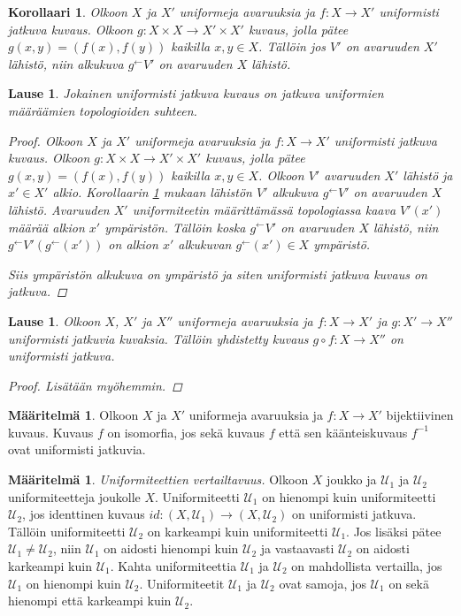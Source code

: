 \documentclass[12pt,a4paper,leqno]{report}
\newcommand{\U}{\mathcal{U}}
\theoremstyle{plain}
\newtheorem{lause}[equation]{Lause}
\newtheorem{kor}[equation]{Korollaari}
\theoremstyle{definition}
\newtheorem{maar}[equation]{Määritelmä}
\theoremstyle{remark}
\begin{document}
\begin{kor}\label{uniformi alkukuva}
Olkoon $X$ ja $X'$ uniformeja avaruuksia 
ja $f\colon X\rightarrow X'$ uniformisti jatkuva kuvaus. 
Olkoon $g\colon X\times X\rightarrow X'\times X'$ %
kuvaus, jolla pätee $g(x,y)=(f(x),f(y))$ kaikilla $x,y\in X$. 
Tällöin jos $V'$ on avaruuden $X'$ lähistö, niin alkukuva $g^{\leftarrow}V'$ on avaruuden $X$ lähistö.
\end{kor}
\begin{lause}
Jokainen uniformisti jatkuva kuvaus on jatkuva uniformien määräämien topologioiden suhteen.
\begin{proof}
Olkoon $X$ ja $X'$ uniformeja avaruuksia 
ja $f\colon X\rightarrow X'$ uniformisti jatkuva kuvaus. 
Olkoon $g\colon X\times X\rightarrow X'\times X'$ %
kuvaus, jolla pätee $g(x,y)=(f(x),f(y))$ kaikilla $x,y\in X$. 
Olkoon $V'$ avaruuden $X'$ lähistö ja $x'\in X'$ alkio. 
Korollaarin \ref{uniformi alkukuva} mukaan lähistön $V'$ alkukuva $g^{\leftarrow}V'$ on avaruuden $X$ lähistö. 
Avaruuden $X'$ uniformiteetin määrittämässä topologiassa kaava $V'(x')$ määrää alkion $x'$ ympäristön.
Tällöin koska $g^{\leftarrow}V'$ on avaruuden $X$ lähistö, niin $g^{\leftarrow}V'(g^{\leftarrow}(x'))$ on alkion $x'$ alkukuvan $g^{\leftarrow}(x')\in X$ ympäristö. 

Siis ympäristön alkukuva on ympäristö ja siten uniformisti jatkuva kuvaus on jatkuva.
\end{proof}
\end{lause}
\begin{lause}
Olkoon $X$, $X'$ ja $X''$ uniformeja avaruuksia 
ja $f\colon X\rightarrow X'$ ja $g\colon X'\rightarrow X''$ uniformisti jatkuvia kuvaksia. Tällöin yhdistetty kuvaus $g\circ f\colon X\rightarrow X''$ on uniformisti jatkuva.
\begin{proof}
Lisätään myöhemmin.
\end{proof}
\end{lause}
\begin{maar}
Olkoon $X$ ja $X'$ uniformeja avaruuksia 
ja $f\colon X\rightarrow X'$ bijektiivinen kuvaus. Kuvaus $f$ on isomorfia, jos sekä kuvaus $f$ että sen käänteiskuvaus $f^{-1}$ ovat uniformisti jatkuvia.
\end{maar}
\begin{maar}\label{uniformi_vertailu}
\emph{Uniformiteettien vertailtavuus.} 
Olkoon $X$ joukko ja $\U_1$ ja $\U_2$ uniformiteetteja joukolle $X$. 
Uniformiteetti $\U_1$ on hienompi kuin uniformiteetti $\U_2$, 
jos identtinen kuvaus $id\colon (X,\U_1)\rightarrow (X,\U_2)$ on uniformisti jatkuva. Tällöin uniformiteetti $\U_2$ on karkeampi kuin uniformiteetti $\U_1$. 
Jos lisäksi pätee $\U_1\neq\U_2$, niin $\U_1$ on aidosti hienompi kuin $\U_2$ ja vastaavasti $\U_2$ on aidosti karkeampi kuin $\U_1$. 
Kahta uniformiteettia $\U_1$ ja $\U_2$ on mahdollista vertailla, jos $\U_1$ on hienompi kuin $\U_2$. Uniformiteetit $\U_1$ ja $\U_2$ ovat samoja, jos $\U_1$ on sekä hienompi että karkeampi kuin $\U_2$.
\end{maar}
\end{document}
